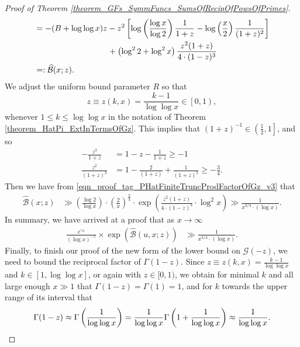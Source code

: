 \documentclass[11pt,reqno,a4letter]{article}
\numberwithin{figure}{section}
\numberwithin{table}{section}
\theoremstyle{plain}
\numberwithin{theorem}{section}
\theoremstyle{definition}
\begin{document}
\begin{proof}[Proof of Theorem \ref{theorem_GFs_SymmFuncs_SumsOfRecipOfPowsOfPrimes}]
\begin{align}
\label{eqn_proof_tag_PHatFiniteTruncProdFactorOfGz_v3} 
     & = -(B + \log\log x) z - z^2 \left[ 
     \log\left(\frac{\log x}{\log 2}\right) \frac{1}{1+z} - 
     \log\left(\frac{x}{2}\right) \frac{1}{(1+z)^2}\right] \\ 
\notag 
     & \phantom{= -(B + \log\log x) z\ } + 
     \left(\log^2 2 + \log^2 x\right) \frac{z^2 (1+z)}{4 \cdot (1-z)^3} \\ 
\notag 
     & =: \widehat{\mathcal{B}}(x; z). 
\end{align} 
We adjust the uniform bound parameter $R$ so that 
$$z \equiv z(k, x) = \frac{k-1}{\log\log x} \in \left[0, 1\right),$$ 
whenever $1 \leq k \leq \log\log x$ 
in the notation of Theorem \ref{theorem_HatPi_ExtInTermsOfGz}. 
This implies that $(1+z)^{-1} \in \left(\frac{1}{2}, 1\right]$, and so 
\begin{align*} 
-\frac{z^2}{1+z} & = 1 - z - \frac{1}{1+z} \geq -1 \\ 
\frac{z^2}{(1+z)^2} & = 1 - \frac{2}{(1+z)} + \frac{1}{(1+z)^2} \geq -\frac{3}{4}. 
\end{align*} 
Then we have from \eqref{eqn_proof_tag_PHatFiniteTruncProdFactorOfGz_v3} that 
\begin{align*} 
\widehat{\mathcal{B}}(x; z) & \gg \left(\frac{\log 2}{\log x}\right) \cdot 
     \left(\frac{2}{x}\right)^{\frac{3}{4}} \cdot \exp\left( 
     \frac{z^2 (1+z)}{4 \cdot (1-z)^3} \cdot \log^2 x\right) 
     \gg \frac{1}{x^{3/4} \cdot (\log x)}. 
\end{align*} 
In summary, we have arrived at a proof that 
as $x \rightarrow \infty$
\begin{align} 
\label{eqn_proof_tag_simpl_v1} 
\frac{e^{\gamma z}}{(\log x)^{-z}} \times \exp\left(\widehat{\mathcal{B}}(u, x; z)\right) & \gg 
     \frac{1}{x^{3/4} \cdot (\log x)}. 
\end{align} 
Finally, to finish our proof of the new form of the lower bound on $\mathcal{G}(-z)$, 
we need to bound the reciprocal factor of $\Gamma(1-z)$. 
Since $z \equiv z(k, x) = \frac{k-1}{\log\log x}$ and 
$k \in [1, \log\log x]$, or again with $z \in [0, 1)$, 
we obtain for minimal $k$ and all large enough $x \gg 1$ that 
$\Gamma(1-z) = \Gamma(1) = 1$, and for $k$ towards the upper range of 
its interval that 
\[
\Gamma(1-z) \approx \Gamma\left(\frac{1}{\log\log x}\right) = 
     \frac{1}{\log\log x} \Gamma\left(1 + \frac{1}{\log\log x}\right) 
     \approx \frac{1}{\log\log x}. 
     \qedhere 
\]
\end{proof} 
\end{document}

